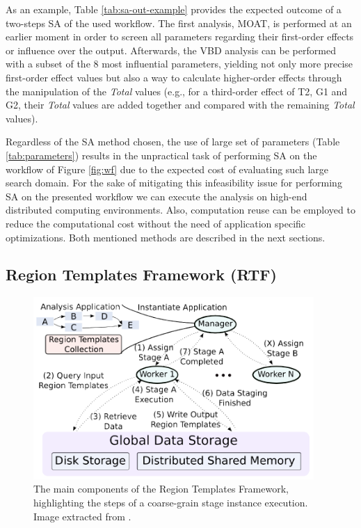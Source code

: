 As an example, Table \ref{tab:sa-out-example} provides the expected outcome of a two-steps SA of the used workflow. The first analysis, MOAT, is performed at an earlier moment in order to screen all parameters regarding their first-order effects or influence over the output. Afterwards, the VBD analysis can be performed with a subset of the 8 most influential parameters, yielding not only more precise first-order effect values but also a way to calculate higher-order effects through the manipulation of the {\it Total} values (e.g., for a third-order effect of T2, G1 and G2, their {\it Total} values are added together and compared with the remaining {\it Total} values).

Regardless of the SA method chosen, the use of large set of parameters (Table \ref{tab:parameters}) results in the unpractical task of performing SA on the workflow of Figure \ref{fig:wf} due to the expected cost of evaluating such large search domain. For the sake of mitigating this infeasibility issue for performing SA on the presented workflow we can execute the analysis on high-end distributed computing environments. Also, computation reuse can be employed to reduce the computational cost without the need of application specific optimizations. Both  mentioned methods are described in the next sections.

\subsection{Region Templates Framework (RTF)}

\begin{figure}[b!]
\begin{center}
\includegraphics[width=0.95\textwidth]{img/stage_sched.png}
\caption{The main components of the Region Templates Framework, highlighting the steps of a coarse-grain stage instance execution. Image extracted from \cite{rtf1}.}
\label{fig:ss}
\end{center}
\end{figure}

